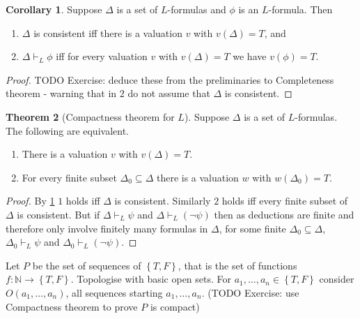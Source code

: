 \documentclass{article}
\newcommand{\N}{\mathbb{N}}
\newcommand{\rb}[1]{\left( #1 \right)}
\newcommand{\cb}[1]{\left\{ #1 \right\}}
\newcommand{\notb}[1]{\rb{\neg #1}}
\theoremstyle{definition}\newtheorem{definition}{Definition}[subsection]
\theoremstyle{definition}\newtheorem{remark}[definition]{Remark}
\theoremstyle{definition}\newtheorem*{example}{Example}
\theoremstyle{definition}\newtheorem*{note}{Note}
\newtheorem{theorem}[definition]{Theorem}
\newtheorem{corollary}[definition]{Corollary}
\begin{document}
\begin{corollary}
\label{cor:1.3.12}
Suppose $ \Delta $ is a set of $ L $-formulas and $ \phi $ is an $ L $-formula. Then
\begin{enumerate}
\item $ \Delta $ is consistent iff there is a valuation $ v $ with $ v\rb{\Delta} = T $, and
\item $ \Delta \vdash_L \phi $ iff for every valuation $ v $ with $ v\rb{\Delta} = T $ we have $ v\rb{\phi} = T $.
\end{enumerate}
\end{corollary}

\begin{proof}
TODO Exercise: deduce these from the preliminaries to Completeness theorem - warning that in $ 2 $ do not assume that $ \Delta $ is consistent.
\end{proof}

\begin{theorem}[Compactness theorem for $ L $]
Suppose $ \Delta $ is a set of $ L $-formulas. The following are equivalent.
\begin{enumerate}
\item There is a valuation $ v $ with $ v\rb{\Delta} = T $.
\item For every finite subset $ \Delta_0 \subseteq \Delta $ there is a valuation $ w $ with $ w\rb{\Delta_0} = T $.
\end{enumerate}
\end{theorem}

\begin{proof}
By \ref{cor:1.3.12} $ 1 $ holds iff $ \Delta $ is consistent. Similarly $ 2 $ holds iff every finite subset of $ \Delta $ is consistent. But if $ \Delta \vdash_L \psi $ and $ \Delta \vdash_L \notb{\psi} $ then as deductions are finite and therefore only involve finitely many formulas in $ \Delta $, for some finite $ \Delta_0 \subseteq \Delta $, $ \Delta_0 \vdash_L \psi $ and $ \Delta_0 \vdash_L \notb{\psi} $.
\end{proof}

Let $ P $ be the set of sequences of $ \cb{T, F} $, that is the set of functions $ f : \N \to \cb{T, F} $. Topologise with basic open sets. For $ a_1, \dots, a_n \in \cb{T, F} $ consider $ O\rb{a_1, \dots, a_n} $, all sequences starting $ a_1, \dots, a_n $. (TODO Exercise: use Compactness theorem to prove $ P $ is compact)

\end{document}
